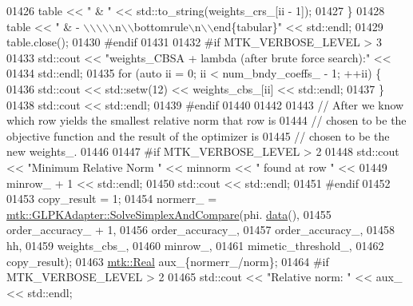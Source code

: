 \begin{DoxyCode}
{{01426       table << \textcolor{stringliteral}{" & "} << std::to\_string(weights\_crs\_[ii - 1]);
01427     \}
01428     table << \textcolor{stringliteral}{" & - \(\backslash\)\(\backslash\)\(\backslash\)\(\backslash\)\(\backslash\)n\(\backslash\)\(\backslash\)bottomrule\(\backslash\)n\(\backslash\)\(\backslash\)end\{tabular\}"} << std::endl;
01429     table.close();
01430 \textcolor{preprocessor}{    #endif}
01431 
01432 \textcolor{preprocessor}{    #if MTK\_VERBOSE\_LEVEL > 3}
01433     std::cout << \textcolor{stringliteral}{"weights\_CBSA + lambda (after brute force search):"} <<
01434       std::endl;
01435     \textcolor{keywordflow}{for} (\textcolor{keyword}{auto} ii = 0; ii < num\_bndy\_coeffs\_ - 1; ++ii) \{
01436       std::cout << std::setw(12) << weights\_cbs\_[ii] << std::endl;
01437     \}
01438     std::cout << std::endl;
01439 \textcolor{preprocessor}{    #endif}
01440 
01442 
01443     \textcolor{comment}{// After we know which row yields the smallest relative norm that row is}
01444     \textcolor{comment}{// chosen to be the objective function and the result of the optimizer is}
01445     \textcolor{comment}{// chosen to be the new weights\_.}
01446 
01447 \textcolor{preprocessor}{    #if MTK\_VERBOSE\_LEVEL > 2}
01448     std::cout << \textcolor{stringliteral}{"Minimum Relative Norm "} << minnorm << \textcolor{stringliteral}{" found at row "} <<
01449       minrow\_ + 1 << std::endl;
01450     std::cout << std::endl;
01451 \textcolor{preprocessor}{    #endif}
01452 
01453     copy\_result = 1;
01454     normerr\_ = \hyperlink{classmtk_1_1GLPKAdapter_a0c9ebb125445bc5af752bf4fb47f44b2}{mtk::GLPKAdapter::SolveSimplexAndCompare}(phi.
      \hyperlink{classmtk_1_1DenseMatrix_a0c33b8a9e01d157c61ddbdf807c25d84}{data}(),
01455                                                         order\_accuracy\_ + 1,
01456                                                         order\_accuracy\_,
01457                                                         order\_accuracy\_,
01458                                                         hh,
01459                                                         weights\_cbs\_,
01460                                                         minrow\_,
01461                                                         mimetic\_threshold\_,
01462                                                         copy\_result);
01463     \hyperlink{group__c01-roots_gac080bbbf5cbb5502c9f00405f894857d}{mtk::Real} aux\_\{normerr\_/norm\};
01464 \textcolor{preprocessor}{    #if MTK\_VERBOSE\_LEVEL > 2}
01465     std::cout << \textcolor{stringliteral}{"Relative norm: "} << aux\_ << std::endl;
}}
\end{DoxyCode}
